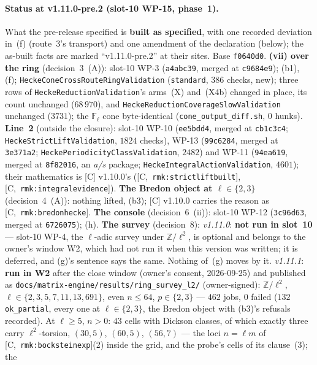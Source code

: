 \documentclass[11pt]{article}
\theoremstyle{remark}
\newcommand{\F}{\mathbb{F}}
\newcommand{\Z}{\mathbb{Z}}
\newcommand{\Fl}{\F_\ell}
\newcommand{\HA}[1]{[C,~\texttt{#1}]}      %
\begin{document}
\paragraph{Status at v1.11.0-pre.2 (slot-10 WP-15, phase~1).} What the pre-release specified is
\textbf{built as specified}, with one recorded deviation in~(f) (route~3's transport) and one
amendment of the declaration (below); the as-built facts are marked ``v1.11.0-pre.2'' at their
sites. Base \texttt{f0640d0}. \textbf{(vii) over the ring} (decision~3~(A)): slot-10 WP-3
(\texttt{a4abc39}, merged at \texttt{c9684e9}); (b1), (f); \texttt{HeckeConeCrossRouteRingValidation}
(\texttt{standard}, $386$ checks, new); three rows of \texttt{HeckeReductionValidation}'s arms~(X)
and~(X4b) changed in place, its count unchanged ($68\,970$), and
\texttt{HeckeReductionCoverageSlowValidation} unchanged ($3731$); the $\Fl$ cone byte-identical
(\texttt{cone\_output\_diff.sh}, $0$ hunks). \textbf{Line~2} (outside the closure): slot-10 WP-10
(\texttt{ee5bdd4}, merged at \texttt{cb1c3c4}; \texttt{HeckeStrictLiftValidation}, $1824$ checks),
WP-13 (\texttt{99c6284}, merged at \texttt{3e371a2}; \texttt{HeckePeriodicityClassValidation},
$2482$) and WP-11 (\texttt{94ea619}, merged at \texttt{8f82016}, an \emph{a/s} package;
\texttt{HeckeIntegralActionValidation}, $4601$); their mathematics is [C] v1.10.0's
(\HA{rmk:strictliftbuilt}, \HA{rmk:integralevidence}). \textbf{The Bredon object at
$\ell\in\{2,3\}$} (decision~4~(A)): nothing lifted, (b3); [C] v1.10.0 carries the reason as
\HA{rmk:bredonhecke}. \textbf{The console} (decision~6~(ii)): slot-10 WP-12 (\texttt{3c96d63},
merged at \texttt{6726075}); (h). \textbf{The survey} (decision~8): \emph{v1.11.0}: \textbf{not run in slot~10} --- slot-10 WP-4,
the $\ell$-adic survey under $\Z/\ell^2$, is optional and belongs to the owner's window W2, which had
not run it when this version was written; it is deferred, and (g)'s sentence says the same. Nothing
of~(g) moves by it. \emph{v1.11.1}: \textbf{run in W2} after the close window (owner's consent,
2026-09-25) and published as \texttt{docs/matrix-engine/results/ring\_survey\_l2/} (owner-signed):
$\Z/\ell^2$, $\ell\in\{2,3,5,7,11,13,691\}$, even $n\le64$, $p\in\{2,3\}$ --- $462$ jobs, $0$
failed ($132$ \texttt{ok\_partial}, every one at $\ell\in\{2,3\}$, the Bredon object with (b3)'s
refusals recorded). At $\ell\ge5$, $n>0$: $43$ cells with Dickson classes, of which exactly three
carry $\ell^2$-torsion, $(30,5)$, $(60,5)$, $(56,7)$ --- the loci $n=\ell m$ of
\HA{rmk:bocksteinexp}(2) inside the grid, and the probe's cells of its clause~(3); the
\end{document}
